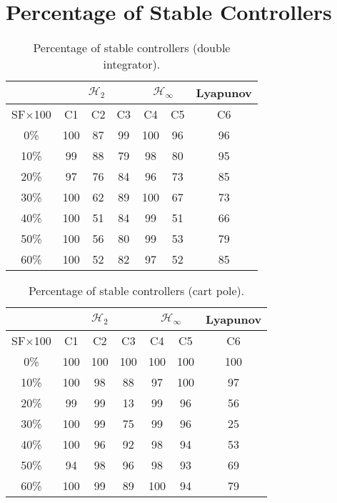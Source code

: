 \section{Percentage of Stable Controllers}
\begin{table}[H]
\centering
\scriptsize
\begin{tabular}{| c || c | c | c | c | c | c |}
	\hline
	 & \multicolumn{3}{c|}{$\mathcal{H}_{2}$} & \multicolumn{2}{c|}{$\mathcal{H}_{\infty}$} & Lyapunov\\
	\hline
	SF$\times$100 & C1& C2 & C3 & C4 & C5 & C6\\
	\hline\hline
	 0\% & 100 & 87 & 99 & 100 & 96 & 96 \\
	\hline
	10\% & 99 & 88 & 79 & 98 & 80 & 95\\
	\hline
	20\% & 97 & 76 & 84 & 96 & 73 & 85\\
	\hline
	30\% & 100 & 62 & 89 & 100 & 67 & 73\\
	\hline
	40\% & 100 & 51 & 84 & 99 & 51 & 66\\
	\hline
	50\% & 100 & 56 & 80 & 99 & 53 & 79\\
	\hline
	60\% & 100 & 52 & 82 & 97 & 52 & 85\\
	\hline
\end{tabular}
\caption{Percentage of stable controllers (double integrator).}
\label{table:percent_stable_double_integrator:noise}
\end{table}

\begin{table}[H]
\centering
\scriptsize
\begin{tabular}{| c || c | c | c | c | c | c |}
	\hline
	 & \multicolumn{3}{c|}{$\mathcal{H}_{2}$} & \multicolumn{2}{c|}{$\mathcal{H}_{\infty}$} & Lyapunov\\
	\hline
	SF$\times$100 & C1& C2 & C3 & C4 & C5 & C6\\
	\hline\hline
	 0\% & 100 & 100 & 100 & 100 & 100 & 100 \\
	\hline
	10\% & 100 & 98 & 88 & 97 & 100 & 97\\
	\hline
	20\% & 99 & 99 & 13 & 99 & 96 & 56\\
	\hline
	30\% & 100 & 99 & 75 & 99 & 96 & 25\\
	\hline
	40\% & 100 & 96 & 92 & 98 & 94 & 53\\
	\hline
	50\% & 94 & 98 & 96 & 98 & 93 & 69\\
	\hline
	60\% & 100 & 99 & 89 & 100 & 94 & 79\\
	\hline
\end{tabular}
\caption{Percentage of stable controllers (cart pole).}
\label{table:percent_stable_cart_pole:noise}
\end{table}


